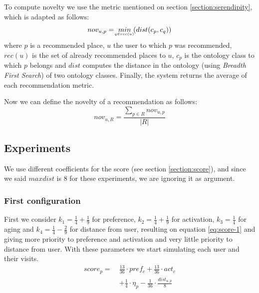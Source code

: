 To compute novelty \cite{kotkov2016survey} we use the metric mentioned on section \ref{section:serendipity}, which is adapted as follows:
\begin{equation} \label{eq:novelty}
    nov_{u, p} = \  \underaccent{q \in rec(u)}{min} \  ( dist( c_p, c_q ) )
\end{equation}
where $p$ is a recommended place, $u$ the user to which $p$ was recommended, $rec(u)$ is the set of already recommended places to $u$, $c_p$ is the ontology class to which $p$ belongs and $dist$ computes the distance in the ontology (using \textit{Breadth First Search}) of two ontology classes. Finally, the system returns the average of each recommendation metric.

Now we can define the novelty of a recommendation as follows:
\begin{equation}
    nov_{u, R} = \frac{ \displaystyle \sum_{p \in R}{nov_{u, p}} }{| R |}
\end{equation}

\subsection{Experiments}
We use different coefficients for the score (see section \ref{section:score}), and since we said $maxdist$ is $8$ for these experiments, we are ignoring it as argument. 

\subsubsection{First configuration}
First we consider $k_1 = \frac{1}{4} + \frac{1}{9}$ for preference, $k_2 = \frac{1}{4} + \frac{1}{9}$ for activation, $k_3 = \frac{1}{4}$ for aging and $k_4 = \frac{1}{4} - \frac{2}{9}$ for distance from user, resulting on equation \ref{eq:score-1} and giving more priority to preference and activation and very little priority to distance from user. With these parameters we start simulating each user and their visits.
\begin{equation} \label{eq:score-1}
    \begin{split}
        score_p = \ &\frac{13}{36} \cdot pref_c + \frac{13}{36} \cdot act_c \\
                                        &+ \frac{1}{4} \cdot \eta_p - \frac{1}{36} \cdot \frac{dist_{u,p}}{8}
    \end{split}
\end{equation}

